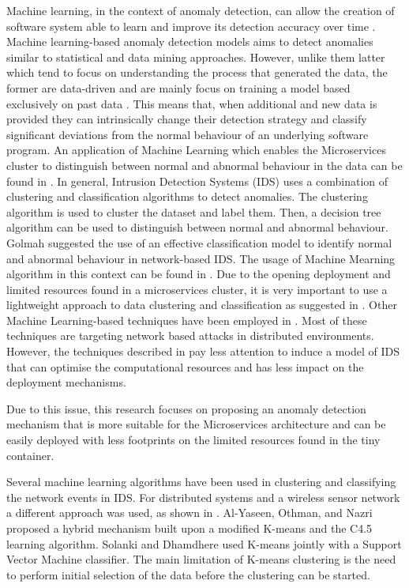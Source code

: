 \documentclass[sigconf]{acmart}
\begin{document}
Machine learning, in the context of  anomaly detection, can allow the creation of  software system able to learn and improve its detection accuracy over time \cite{bujlow2012method}.
Machine learning-based anomaly detection models aims to detect anomalies similar to statistical and data mining approaches. However, unlike them latter which tend to focus on understanding the process that generated the data, the former are data-driven and are mainly focus on training a model based exclusively on past data \cite{Patcha:2007hja}. This means that, when additional and new data is provided they can intrinsically change their detection strategy and classify significant deviations from the normal behaviour of an underlying software program.
An application of Machine Learning which enables the Microservices cluster to distinguish between normal and abnormal behaviour in the data can be found in \cite{Buczak:2016kt}. 
In general, Intrusion Detection Systems (IDS) uses a combination of clustering and classification algorithms to detect anomalies. The clustering algorithm is used to cluster the dataset and label them. Then, a decision tree algorithm can be used to distinguish between normal and abnormal behaviour.
Golmah \cite{golmah2014efficient} suggested the use of an effective classification model to identify normal and abnormal behaviour in network-based IDS. The usage of Machine Mearning algorithm  in this context can be found in  \cite{golmah2014efficient,Amudhavel:2016kj,haq2015application,Buczak:2016kt,doelitzscher2012agent}. Due to the  opening deployment and limited resources found in a microservices cluster, it is very important to use a lightweight approach to data clustering and classification as suggested in \cite{roesch1999snort,li2006lightweight,snapp1991dids}.
Other Machine Learning-based techniques have been employed in \cite{MdFudzee:2008p3737,pajouh2016two,hodo2016threat}. Most of these techniques are targeting network based attacks in distributed environments. However, the techniques described in \cite{MdFudzee:2008p3737,pajouh2016two,hodo2016threat} pay less attention to induce a model of IDS that can optimise the computational resources and has less impact on the deployment mechanisms. 

Due to this issue, this research focuses on proposing an anomaly detection mechanism that is more suitable for the Microservices architecture and can be easily deployed with less footprints on the limited resources found in the tiny container. 

Several machine learning algorithms have been used in clustering and classifying the network events in IDS. For distributed systems and a wireless sensor network a different approach was used, as shown in \cite{Mishra:2009p3734,lee1999data,li2006lightweight}. Al-Yaseen, Othman, and Nazri \cite{al2017multi} proposed a hybrid mechanism built upon a modified K-means and the C4.5 learning algorithm. Solanki and Dhamdhere \cite{solankiintrusion} used K-means jointly with a Support Vector Machine classifier. The main limitation of K-means clustering is the need to perform initial selection of the data before the clustering can be started. 
 
\end{document}
